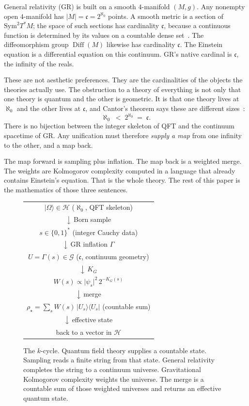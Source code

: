\documentclass[11pt,a4paper]{article}
\theoremstyle{plain}
\theoremstyle{definition}
\theoremstyle{remark}
\newcommand{\alef}{\aleph_{0}}
\newcommand{\cont}{\mathfrak{c}}
\newcommand{\Hil}{\mathcal{H}}
\newcommand{\Geo}{\mathcal{G}}
\newcommand{\KG}{K_{G}}
\newcommand{\abs}[1]{\lvert#1\rvert}
\newcommand{\ket}[1]{\lvert#1\rangle}
\newcommand{\bra}[1]{\langle#1\rvert}
\newcommand{\Diff}{\operatorname{Diff}}
\begin{document}
General relativity (GR) is built on a smooth $4$-manifold $(M,g)$.
Any nonempty open $4$-manifold has $\abs{M}=\cont=2^{\alef}$ points.
A smooth metric is a section of $\mathrm{Sym}^{2}T^{*}M$; the space of such sections has cardinality $\cont$, because a continuous function is determined by its values on a countable dense set~\cite{cantor1878}.
The diffeomorphism group $\Diff(M)$ likewise has cardinality $\cont$.
The Einstein equation is a differential equation on this continuum.
GR's native cardinal is $\cont$, the infinity of the reals.

These are not aesthetic preferences.
They are the cardinalities of the objects the theories actually use.
The obstruction to a theory of everything is not only that one theory is quantum and the other is geometric.
It is that one theory lives at $\alef$ and the other lives at $\cont$, and Cantor's theorem says these are different sizes~\cite{cantor1891}:
\begin{equation}
  \alef \;<\; 2^{\alef} \;=\; \cont.
\end{equation}
There is no bijection between the integer skeleton of QFT and the continuum spacetime of GR.
Any unification must therefore \emph{supply a map} from one infinity to the other, and a map back.

The map forward is sampling plus inflation.
The map back is a weighted merge.
The weights are Kolmogorov complexity computed in a language that already contains Einstein's equation.
That is the whole theory.
The rest of this paper is the mathematics of those three sentences.

\begin{figure}[t]
\centering
{\small
\begin{tabular}{@{}c@{}}
$\ket{\Omega}\in\Hil$ \quad ($\alef$, QFT skeleton)\\[2pt]
$\big\downarrow$ \quad Born sample\\[2pt]
$s\in\{0,1\}^{*}$ \quad (integer Cauchy data)\\[2pt]
$\big\downarrow$ \quad GR inflation $\Gamma$\\[2pt]
$U=\Gamma(s)\in\Geo$ \quad ($\cont$, continuum geometry)\\[2pt]
$\big\downarrow$ \quad $\KG$\\[2pt]
$W(s)\propto \abs{\psi_{s}}^{2}\,2^{-\KG(s)}$\\[2pt]
$\big\downarrow$ \quad merge\\[2pt]
$\rho_{\star}=\sum_{s}W(s)\,\ket{U_{s}}\bra{U_{s}}$ \quad (countable sum)\\[2pt]
$\big\downarrow$ \quad effective state\\[2pt]
back to a vector in $\Hil$
\end{tabular}}
\caption{The $k$-cycle.
Quantum field theory supplies a countable state.
Sampling reads a finite string from that state.
General relativity completes the string to a continuum universe.
Gravitational Kolmogorov complexity weights the universe.
The merge is a countable sum of those weighted universes and returns an effective quantum state.}
\label{fig:cycle}
\end{figure}
\end{document}
